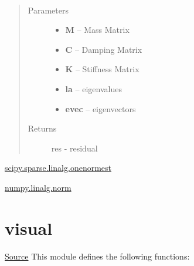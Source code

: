 \documentclass[letterpaper,10pt,english]{sphinxmanual}
\begin{document}
\begin{fulllineitems}
\label{index:brake.analyze.residual.residual_qevp}~\begin{quote}\begin{description}
\item[{Parameters}] \leavevmode\begin{itemize}
\item {} 
\textbf{M} -- Mass Matrix

\item {} 
\textbf{C} -- Damping Matrix

\item {} 
\textbf{K} -- Stiffness Matrix

\item {} 
\textbf{la} -- eigenvalues

\item {} 
\textbf{evec} -- eigenvectors

\end{itemize}

\item[{Returns}] \leavevmode
res - residual

\end{description}\end{quote}

\end{fulllineitems}





\href{http://docs.scipy.org/doc/scipy-dev/reference/generated/scipy.sparse.linalg.onenormest.html}{scipy.sparse.linalg.onenormest}

\href{http://docs.scipy.org/doc/numpy/reference/generated/numpy.linalg.norm.html}{numpy.linalg.norm}




\section{visual}
\label{index:visual}
\href{https://bitbucket.org/akadar/brakesqueal0.1/src/master/brake/analyze/visual.py?at=master}{Source}
\label{index:module-brake.analyze.visual}
This module defines the following functions:
\end{document}
